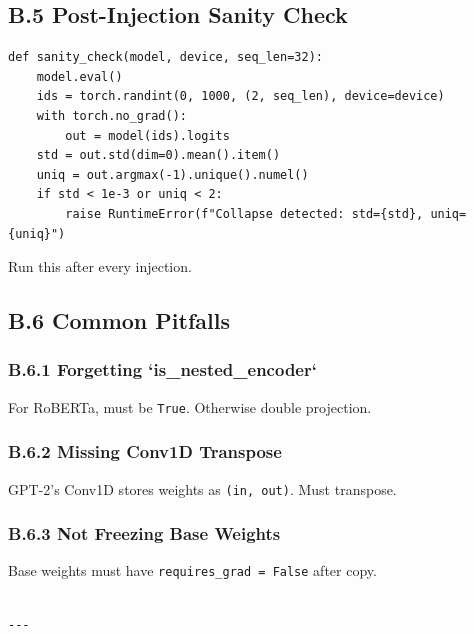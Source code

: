\subsection{B.5 Post-Injection Sanity Check}

\begin{lstlisting}
def sanity_check(model, device, seq_len=32):
    model.eval()
    ids = torch.randint(0, 1000, (2, seq_len), device=device)
    with torch.no_grad():
        out = model(ids).logits
    std = out.std(dim=0).mean().item()
    uniq = out.argmax(-1).unique().numel()
    if std < 1e-3 or uniq < 2:
        raise RuntimeError(f"Collapse detected: std={std}, uniq={uniq}")
\end{lstlisting}

Run this after every injection.

\subsection{B.6 Common Pitfalls}

\subsubsection{B.6.1 Forgetting `is\_nested\_encoder`}

For RoBERTa, must be \texttt{True}. Otherwise double projection.

\subsubsection{B.6.2 Missing Conv1D Transpose}

GPT-2's Conv1D stores weights as \texttt{(in, out)}. Must transpose.

\subsubsection{B.6.3 Not Freezing Base Weights}

Base weights must have \texttt{requires\_grad = False} after copy.
\begin{lstlisting}

---
\end{lstlisting}